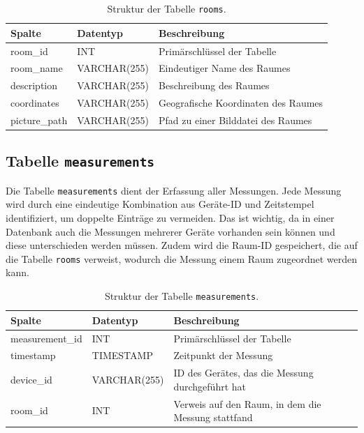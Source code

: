 \begin{table}[h]
    \centering
    \begin{tabularx}{\textwidth}{|l|l|X|}
        \hline
        \textbf{Spalte} & \textbf{Datentyp} & \textbf{Beschreibung} \\ \hline
        room\_id & INT & Primärschlüssel der Tabelle \\ \hline
        room\_name & VARCHAR(255) & Eindeutiger Name des Raumes \\ \hline
        description & VARCHAR(255) & Beschreibung des Raumes \\ \hline
        coordinates & VARCHAR(255) & Geografische Koordinaten des Raumes \\ \hline
        picture\_path & VARCHAR(255) & Pfad zu einer Bilddatei des Raumes \\ \hline
    \end{tabularx}
    \caption{Struktur der Tabelle \texttt{rooms}.}
    \label{tab:rooms}
\end{table}

\subsection{Tabelle \texttt{measurements}}

Die Tabelle \texttt{measurements} dient der Erfassung aller Messungen. Jede Messung wird durch eine eindeutige Kombination aus Geräte-ID und Zeitstempel identifiziert, um doppelte Einträge zu vermeiden. Das ist wichtig, da in einer Datenbank auch die Messungen mehrerer Geräte vorhanden sein können und diese unterschieden werden müssen. Zudem wird die Raum-ID gespeichert, die auf die Tabelle \texttt{rooms} verweist, wodurch die Messung einem Raum zugeordnet werden kann.

\begin{table}[h]
    \centering
    \begin{tabularx}{\textwidth}{|l|l|X|}
        \hline
        \textbf{Spalte} & \textbf{Datentyp} & \textbf{Beschreibung} \\ \hline
        measurement\_id & INT & Primärschlüssel der Tabelle \\ \hline
        timestamp & TIMESTAMP & Zeitpunkt der Messung \\ \hline
        device\_id & VARCHAR(255) & ID des Gerätes, das die Messung durchgeführt hat \\ \hline
        room\_id & INT & Verweis auf den Raum, in dem die Messung stattfand \\ \hline
    \end{tabularx}
    \caption{Struktur der Tabelle \texttt{measurements}.}
    \label{tab:measurements}
\end{table}

